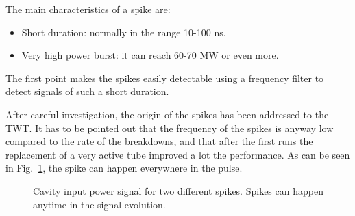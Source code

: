 \noindent
The main characteristics of a spike are:
\begin{itemize}
\item Short duration: normally in the range 10-100 ns.
\item Very high power burst: it can reach 60-70 MW or even more.
\end{itemize}
The first point makes the spikes easily detectable using a frequency filter to detect signals of such a short duration. 

 After careful investigation, the origin of the spikes has been addressed to the TWT. It has to be pointed out that the frequency of the spikes is anyway low compared to the rate of the breakdowns, and that after the first runs the replacement of a very active tube improved a lot the performance. As can be seen in Fig.~\ref{spikesAndDetuning}, the spike can happen everywhere in the pulse.

 \begin{figure}[h]
 \centering
 \hspace{2mm}
 \caption{Cavity input power signal for two different spikes. Spikes can happen anytime in the signal evolution.}
 \label{spikesAndDetuning}
 \end{figure}

